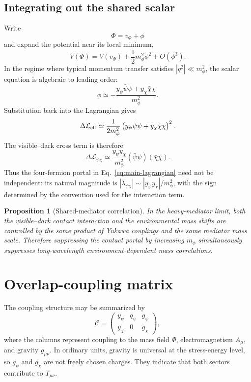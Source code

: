 \documentclass[11pt]{article}
\newtheorem{proposition}{Proposition}
\theoremstyle{remark}
\begin{document}
\subsection{Integrating out the shared scalar}
Write
\begin{equation}
 \Phi=v_\Phi+\phi
\end{equation}
and expand the potential near its local minimum,
\begin{equation}
 V(\Phi)=V(v_\Phi)+\frac12m_\phi^2\phi^2+O(\phi^3).
\end{equation}
In the regime where typical momentum transfer satisfies $|q^2|\ll m_\phi^2$, the scalar equation is algebraic to leading order:
\begin{equation}
 \phi\simeq-\frac{y_\psi\bar\psi\psi+y_\chi\bar\chi\chi}{m_\phi^2}.
 \label{eq:shared-heavy-scalar-solution}
\end{equation}
Substitution back into the Lagrangian gives
\begin{equation}
 \Delta\mathcal L_{\rm eff}
 \simeq \frac{1}{2m_\phi^2}
 \left(y_\psi\bar\psi\psi+y_\chi\bar\chi\chi\right)^2.
 \label{eq:shared-integrated-out}
\end{equation}
The visible--dark cross term is therefore
\begin{equation}
 \Delta\mathcal L_{\psi\chi}
 \simeq \frac{y_\psi y_\chi}{m_\phi^2}
 (\bar\psi\psi)(\bar\chi\chi).
 \label{eq:shared-derived-portal}
\end{equation}
Thus the four-fermion portal in Eq.~\eqref{eq:main-lagrangian} need not be independent: its natural magnitude is $|\lambda_{\psi\chi}|\sim |y_\psi y_\chi|/m_\phi^2$, with the sign determined by the convention used for the interaction term.

\begin{proposition}[Shared-mediator correlation]
In the heavy-mediator limit, both the visible--dark contact interaction and the environmental mass shifts are controlled by the same product of Yukawa couplings and the same mediator mass scale. Therefore suppressing the contact portal by increasing $m_\phi$ simultaneously suppresses long-wavelength environment-dependent mass correlations.
\end{proposition}


\section{Overlap-coupling matrix}
The coupling structure may be summarized by
\begin{equation}
    \mathcal C=
    \begin{pmatrix}
        y_\psi & q_\psi & g_\psi \\
        y_\chi & 0      & g_\chi
    \end{pmatrix},
\end{equation}
where the columns represent coupling to the mass field $\Phi$, electromagnetism $A_\mu$, and gravity $g_{\mu\nu}$. In ordinary units, gravity is universal at the stress-energy level, so $g_\psi$ and $g_\chi$ are not freely chosen charges. They indicate that both sectors contribute to $T_{\mu\nu}$.
\end{document}

